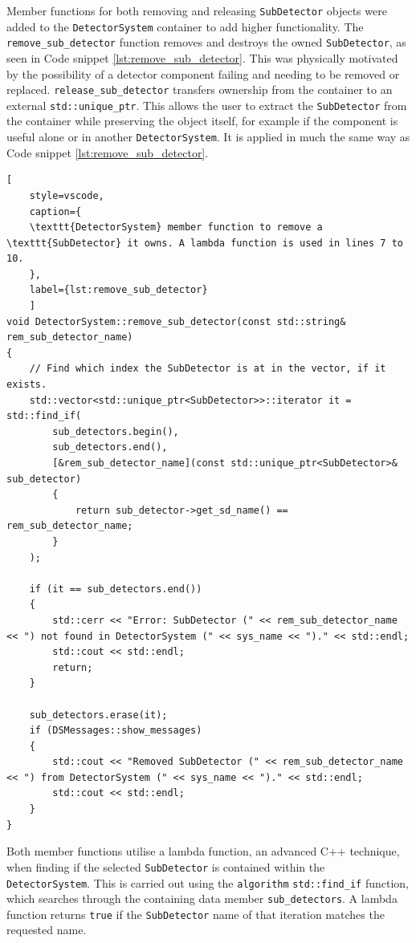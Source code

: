 \documentclass{article}
\begin{document}
Member functions for both removing and releasing \texttt{SubDetector} objects were added to the \texttt{DetectorSystem} container to add higher functionality. 
The \texttt{remove\_sub\_detector} function removes and destroys the owned \texttt{SubDetector}, as seen in Code snippet \ref{lst:remove_sub_detector}. This was physically motivated by the possibility of a detector component failing and needing to be removed or replaced.
\texttt{release\_sub\_detector} transfers ownership from the container to an external \texttt{std::unique\_ptr}. This allows the user to extract the \texttt{SubDetector} from the container while preserving the object itself, for example if the component is useful alone or in another \texttt{DetectorSystem}. It is applied in much the same way as Code snippet \ref{lst:remove_sub_detector}.
\begin{lstlisting}[
    style=vscode, 
    caption={
    \texttt{DetectorSystem} member function to remove a \texttt{SubDetector} it owns. A lambda function is used in lines 7 to 10.
    },
    label={lst:remove_sub_detector}
    ]
void DetectorSystem::remove_sub_detector(const std::string& rem_sub_detector_name)
{
    // Find which index the SubDetector is at in the vector, if it exists.
    std::vector<std::unique_ptr<SubDetector>>::iterator it = std::find_if(
        sub_detectors.begin(),
        sub_detectors.end(),
        [&rem_sub_detector_name](const std::unique_ptr<SubDetector>& sub_detector)
        {
            return sub_detector->get_sd_name() == rem_sub_detector_name;
        }
    );

    if (it == sub_detectors.end())
    {
        std::cerr << "Error: SubDetector (" << rem_sub_detector_name << ") not found in DetectorSystem (" << sys_name << ")." << std::endl;
        std::cout << std::endl;
        return;
    }

    sub_detectors.erase(it);
    if (DSMessages::show_messages)
    {
        std::cout << "Removed SubDetector (" << rem_sub_detector_name << ") from DetectorSystem (" << sys_name << ")." << std::endl;
        std::cout << std::endl;
    }
}
\end{lstlisting}
Both member functions utilise a lambda function, an advanced C++ technique, when finding if the selected \texttt{SubDetector} is contained within the \texttt{DetectorSystem}.
This is carried out using the \texttt{algorithm} \texttt{std::find\_if} function, which searches through the containing data member \texttt{sub\_detectors}.
A lambda function returns \texttt{true} if the \texttt{SubDetector} name of that iteration  matches the requested name.
\end{document}
